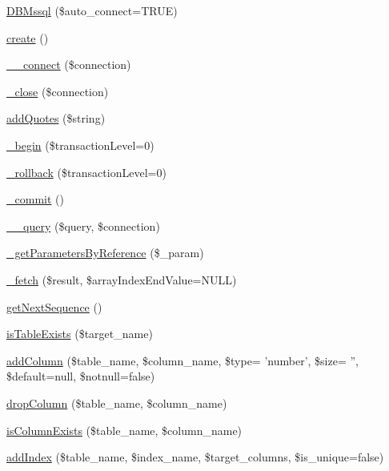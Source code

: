 \begin{DoxyCompactItemize}
\item 
\hyperlink{classDBMssql_ae74126db37fb85343806218896be4451}{D\-B\-Mssql} (\$auto\-\_\-connect=T\-R\-U\-E)
\item 
\hyperlink{classDBMssql_a1be3ce3432e43e0a5080ada450971345}{create} ()
\item 
\hyperlink{classDBMssql_a369f968ee79e1eb30e5d640c2294a7d1}{\-\_\-\-\_\-connect} (\$connection)
\item 
\hyperlink{classDBMssql_a64f2fc08d576cdcfc0dd3a80343a0e5a}{\-\_\-close} (\$connection)
\item 
\hyperlink{classDBMssql_ac380f1918abd17fd5cba28accfaec9fc}{add\-Quotes} (\$string)
\item 
\hyperlink{classDBMssql_ae44697dbc8dd678df78458a407e40c03}{\-\_\-begin} (\$transaction\-Level=0)
\item 
\hyperlink{classDBMssql_a35fd47dce4ad5dabbc3b994f5774afb7}{\-\_\-rollback} (\$transaction\-Level=0)
\item 
\hyperlink{classDBMssql_a08f359cc1c5ce91fde7139446252e8c4}{\-\_\-commit} ()
\item 
\hyperlink{classDBMssql_aa2d0d2f6680d70399f493b567d94ed92}{\-\_\-\-\_\-query} (\$query, \$connection)
\item 
\hyperlink{classDBMssql_a09c8011c16ac2e01c6fca9d6f0e6b7f6}{\-\_\-get\-Parameters\-By\-Reference} (\$\-\_\-param)
\item 
\hyperlink{classDBMssql_aed12cc502a2d8ee9ce8821af12d45b9e}{\-\_\-fetch} (\$result, \$array\-Index\-End\-Value=N\-U\-L\-L)
\item 
\hyperlink{classDBMssql_ad4342b7988253c6bbeec102b2c454659}{get\-Next\-Sequence} ()
\item 
\hyperlink{classDBMssql_add743e9c5148edf4f393209b1f4b9cd6}{is\-Table\-Exists} (\$target\-\_\-name)
\item 
\hyperlink{classDBMssql_a6f2fbcd5fea5ac36821d96cfe8f106cd}{add\-Column} (\$table\-\_\-name, \$column\-\_\-name, \$type= 'number', \$size= '', \$default=null, \$notnull=false)
\item 
\hyperlink{classDBMssql_a802707618ed283cd4143c82972b3ade5}{drop\-Column} (\$table\-\_\-name, \$column\-\_\-name)
\item 
\hyperlink{classDBMssql_a5a96979e7fed50503b902d2983fa507a}{is\-Column\-Exists} (\$table\-\_\-name, \$column\-\_\-name)
\item 
\hyperlink{classDBMssql_a6202a3b8e96252f91ef104a854cf556c}{add\-Index} (\$table\-\_\-name, \$index\-\_\-name, \$target\-\_\-columns, \$is\-\_\-unique=false)

\end{DoxyCompactItemize}
